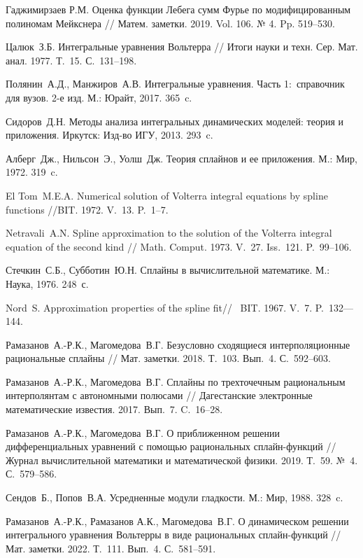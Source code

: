 \begin{thebibliography}{111}
{Гаджимирзаев Р.М.} Оценка функции Лебега сумм Фурье по модифицированным полиномам Мейкснера // Матем. заметки. 2019. Vol. 106. № 4. Pp. 519--530.


 Цалюк~З.Б. Интегральные уравнения Вольтерра //
 Итоги науки и техн. Сер. Мат. анал. 1977. Т.~15.
  С.~131--198.

 Полянин~А.Д., Манжиров~А.В.
Интегральные уравнения. Часть 1:~справочник для вузов.  2-е изд.
 М.: Юрайт, 2017. 365~c.

 Сидоров~Д.Н. Методы анализа интегральных динамических
моделей: теория и приложения.  Иркутск: Изд-во ИГУ, 2013. 293~c.

 Алберг~Дж., Нильсон~Э., Уолш~Дж. Теория сплайнов и ее приложения. М.: Мир, 1972. 319~c.

 El Tom~M.E.A. Numerical solution of Volterra integral equations by spline
 functions //BIT.  1972. V.~13. P.~1--7.

 Netravali~A.N. Spline approximation to the solution of the Volterra integral equation of the
 second kind // Math. Comput. 1973. V.~27.
 Iss.~121. P.~99--106.

 Стечкин~С.Б., Субботин~Ю.Н. Сплайны в вычислительной математике.
 М.: Наука, 1976. 248~с.

 Nord~S. Approximation properties of the spline fit//~ BIT.
1967. V.~7. P.~132—144.

 Рамазанов~А.-Р.К., Магомедова~В.Г. Безусловно сходящиеся
интерполяционные рациональные сплайны // Мат. заметки. 2018. Т.~103.
 Вып.~4. С.~592--603.

 Рамазанов~А.-Р.К., Магомедова~В.Г. Сплайны по трехточечным рациональным интерполянтам
с автономными полюсами //
Дагестанские электронные математические известия. 2017. Вып.~7. C.~16--28.

 Рамазанов~А.-Р.К., Магомедова~В.Г. О приближенном решении дифференциальных
уравнений с помощью рациональных сплайн-функций // Журнал вычислительной математики и
математической физики. 2019. Т.~59. №~4. С.~579–586.

 Сендов~Б., Попов~В.А. Усредненные модули гладкости. М.: Мир,
1988. 328~c.

 Рамазанов~А.-Р.К., Рамазанов А.К., Магомедова~В.Г.
 О динамическом решении интегрального уравнения Вольтерры в виде
 рациональных сплайн-функций // Мат. заметки. 2022. Т.~111.
 Вып.~4. С.~581--591.


\end{thebibliography}
